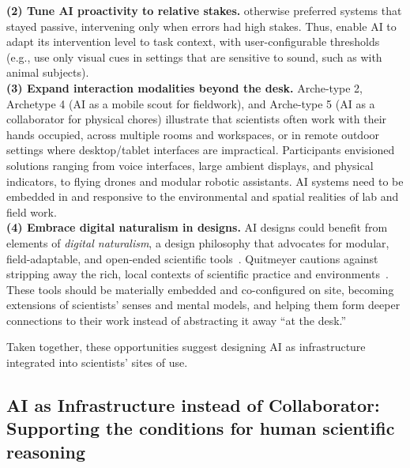 \textbf{(2) Tune AI proactivity to relative stakes.}   otherwise preferred systems that stayed passive, intervening only when errors had high stakes. Thus, enable AI to adapt its intervention level to task context, with user-configurable thresholds (e.g., use only visual cues in settings that are sensitive to sound, such as with animal subjects).
\\

\textbf{(3) Expand interaction modalities beyond the desk.} Arche-type 2, Archetype 4 (AI as a mobile scout for fieldwork), and Arche-type 5 (AI as a collaborator for physical chores) illustrate that scientists often work with their hands occupied, across multiple rooms and workspaces, or in remote outdoor settings where desktop/tablet interfaces are impractical. Participants envisioned solutions ranging from voice interfaces, large ambient displays, and physical indicators, to flying drones and modular robotic assistants. AI systems need to be embedded in and responsive to the environmental and spatial realities of lab and field work.
\\

\textbf{(4) Embrace digital naturalism in designs.}  AI designs could benefit from elements of \emph{digital naturalism}, a design philosophy that advocates for modular, field-adaptable, and open-ended scientific tools~\cite{makery2019quitmeyer}. Quitmeyer cautions against stripping away the rich, local contexts of scientific practice and environments~\cite{quitmeyer2024growing}. These tools should be materially embedded and co-configured on site, becoming extensions of scientists’ senses and mental models, and helping them form deeper connections to their work instead of abstracting it away ``at the desk.''

Taken together, these opportunities suggest designing AI as infrastructure integrated into scientists' sites of use.


\subsection{AI as Infrastructure instead of Collaborator: Supporting the conditions for human scientific reasoning}

